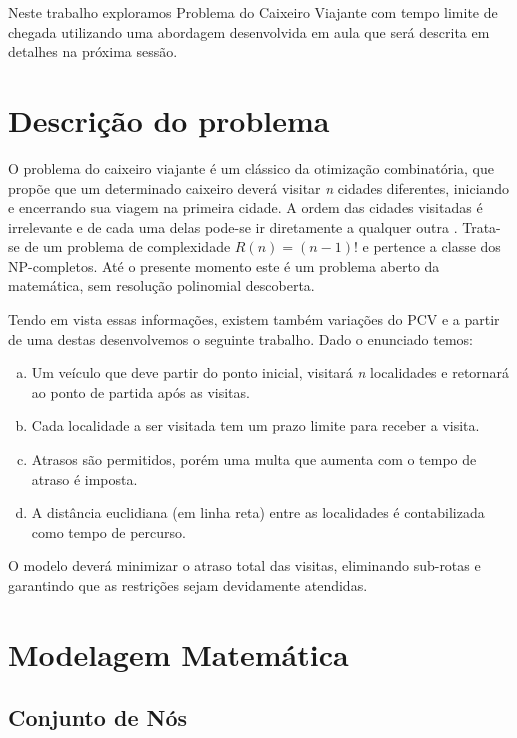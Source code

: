 \documentclass[12pt]{article}
\begin{document}
Neste trabalho exploramos Problema do Caixeiro Viajante com tempo limite de
chegada utilizando uma abordagem desenvolvida em aula que será descrita em
detalhes na próxima sessão.

\section{Descrição do problema}

O problema do caixeiro viajante é um clássico da otimização combinatória, que
propõe que um determinado caixeiro deverá visitar {\it n} cidades diferentes,
iniciando e encerrando sua viagem na primeira cidade. A ordem das cidades
visitadas é irrelevante e de cada uma delas pode-se ir diretamente a qualquer
outra \cite{porto-da-silveira_2000}. Trata-se de um problema de complexidade
$R(n) = (n -1)!$ e pertence a classe dos NP-completos. Até o presente momento
este é um problema aberto da matemática, sem resolução polinomial descoberta.

Tendo em vista essas informações, existem também variações do PCV e a partir de
uma destas desenvolvemos o seguinte trabalho. Dado o enunciado temos:

\begin{enumerate}[(a)]
  \item Um veículo que deve partir do ponto inicial, visitará {\it n} localidades e
        retornará ao ponto de partida após as visitas.
  \item Cada localidade a ser visitada tem um prazo limite para receber a visita.
  \item Atrasos são permitidos, porém uma multa que aumenta com o tempo de atraso é
        imposta.
  \item A distância euclidiana (em linha reta) entre as localidades é contabilizada
        como tempo de percurso.
\end{enumerate}

O modelo deverá minimizar o atraso total das visitas, eliminando sub-rotas e
garantindo que as restrições sejam devidamente atendidas.

\section{Modelagem Matemática}

\subsection{Conjunto de Nós}
\end{document}
